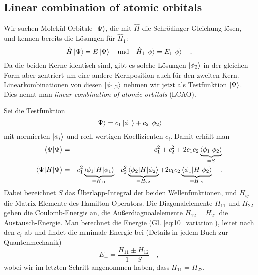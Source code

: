 \subsection{Linear combination of atomic orbitals}

Wir suchen Molekül-Orbitale $\ket{\Psi}$, die mit $\hat{H}$ die Schrödinger-Gleichung lösen, und kennen bereits die Lösungen für $\hat{H}_1$:
\begin{equation}
\hat{H} \ket{\Psi} = E \ket{\Psi} \quad \text{und} \quad 
\hat{H}_1 \ket{\phi} = E_1 \ket{\phi}  \quad .
\end{equation}
Da die beiden Kerne identisch sind, gibt es solche Lösungen $\ket{\phi_2}$ in der gleichen Form aber zentriert um eine andere Kernposition auch für den zweiten Kern. Linearkombinationen von diesen  $\ket{\phi_{1,2}}$ nehmen wir jetzt als Testfunktion $\ket{\Psi}$. Dies nennt man \emph{linear combination of atomic orbitals} (LCAO).



Sei die Testfunktion
\begin{equation}
 \ket{\Psi} = c_1 \ket{\phi_1} + c_2 \ket{\phi_2} \label{eq:10_psi}
\end{equation}
mit normierten  $\ket{\phi_i}$ und reell-wertigen Koeffizienten $c_i$. Damit erhält man
\begin{eqnarray}
\braket{\Psi | \Psi}  &= & c_1^2 + c_2^2  + 2 c_1 c_2 \underbrace{\braket{\phi_1 | \phi_2}}_{= S}\\
\braket{\Psi |  H | \Psi} &=& c_1^2 \underbrace{\braket{\phi_1 |  H | \phi_1 }}_{= H_{11}} +
										c_2^2 \underbrace{\braket{\phi_2 |  H | \phi_2 }}_{= H_{22}} +
								2 c_1 c_2 \underbrace{\braket{\phi_1 |  H | \phi_2 }}_{= H_{12}}  \quad .
\end{eqnarray}
Dabei bezeichnet $S$ das Überlapp-Integral der beiden Wellenfunktionen, und $H_{ij}$ die Matrix-Elemente des Hamilton-Operators. Die Diagonalelemente $H_{11}$ und $H_{22}$ geben die Coulomb-Energie an, die Außerdiagnoalelemente $H_{12} = H_{21}$ die Austausch-Energie. Man berechnet die Energie (Gl. \ref{eq:10_variation}), leitet nach den $c_i$ ab und findet die minimale Energie bei (Details in jedem Buch zur Quantenmechanik)
\begin{equation}
E_\pm = \frac{H_{11} \pm H_{12}}{1 \pm S} \quad ,\label{eq:10_e_variation}
\end{equation}
wobei wir im letzten Schritt angenommen haben, dass $H_{11} = H_{22}$.



